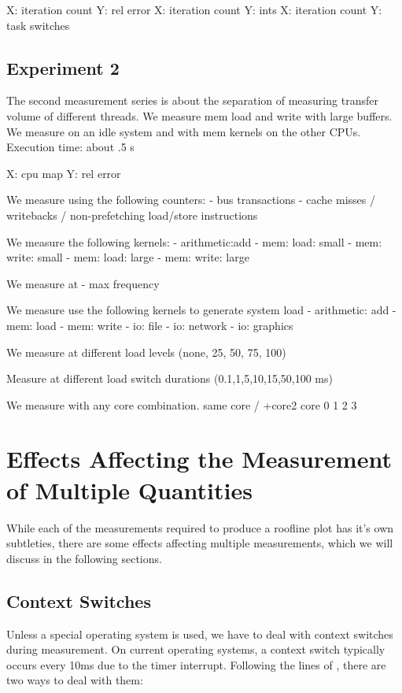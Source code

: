 \documentclass[a4paper,12pt]{article}
\begin{document}
X: iteration count Y: rel error 
X: iteration count Y: ints
X: iteration count Y: task switches

\subsection{Experiment 2}
The second measurement series is about the separation of measuring transfer
volume of different threads. We measure mem load and write with large buffers.
We measure on an idle system and with mem kernels on the other CPUs. Execution
time: about .5 s

X: cpu map Y: rel error

We measure using the following counters:
- bus transactions
- cache misses / writebacks / non-prefetching load/store instructions

We measure the following kernels:
- arithmetic:add
- mem: load: small 
- mem: write: small
- mem: load: large
- mem: write: large

We measure at 
- max frequency

We measure use the following kernels to generate system load
- arithmetic: add
- mem: load
- mem: write
- io: file 
- io: network
- io: graphics

We measure at different load levels (none, 25, 50, 75, 100)

Measure at different load switch durations (0.1,1,5,10,15,50,100 ms)

We measure with any core combination.
same core / +core2
core 0 1 2 3



\section{Effects Affecting the Measurement of Multiple Quantities}
While each of the measurements required to produce a roofline plot has it's own
subtleties, there are some effects affecting multiple measurements, which we
will discuss in the following sections.

\subsection{Context Switches}
Unless a special operating system is used, we have to deal with context switches
during measurement. On current operating systems, a context switch typically
occurs every 10ms due to the timer interrupt. Following the lines of
\cite{ComSysProgPersp}, there are two ways to deal with them:
\end{document}
